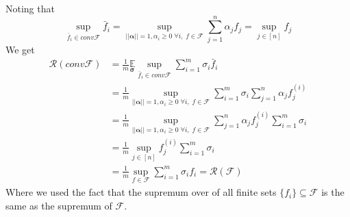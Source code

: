 \subsubsection{}
Noting that
\begin{equation*}    
    \underset{\bar{f}_i \in conv \mathcal{F}}{\sup} \bar{f}_i = \underset{||\pmb{\alpha}||=1, \alpha_i \geq 0 \; \forall i, \; f\in \mathcal{F}}{\sup} \sum_{j=1}^n \alpha_j f_j = \underset{j\in [n]}{\sup} f_j
\end{equation*}
We get
\begin{equation*}
    \begin{split}        
        \mathcal{R}(conv \mathcal{F}) &= \frac{1}{m} \underset{\pmb{\sigma}}{\mathbb{E}} \underset{\bar{f}_i \in conv \mathcal{F}}{\sup} \sum_{i=1}^m \sigma_i \bar{f}_i \\
        &= \frac{1}{m} \underset{||\pmb{\alpha}||=1, \alpha_i \geq 0 \; \forall i, \; f\in \mathcal{F}}{\sup} \sum_{i=1}^m \sigma_i \sum_{j=1}^n \alpha_j f_j^{(i)} \\
        &= \frac{1}{m} \underset{||\pmb{\alpha}||=1, \alpha_i \geq 0 \; \forall i, \; f\in \mathcal{F}}{\sup}  \sum_{j=1}^n \alpha_j f_j^{(i)} \sum_{i=1}^m \sigma_i \\
        &= \frac{1}{m} \underset{j\in [n]}{\sup} f_j^{(i)} \sum_{i=1}^m \sigma_i \\
        &= \frac{1}{m} \underset{f\in \mathcal{F}}{\sup} \sum_{i=1}^m \sigma_i f_i = \mathcal{R}(\mathcal{F})
    \end{split}
\end{equation*}
Where we used the fact that the supremum over of all finite sets $\{f_i\} \subseteq \mathcal{F}$ is the same as the supremum of $\mathcal{F}$.
